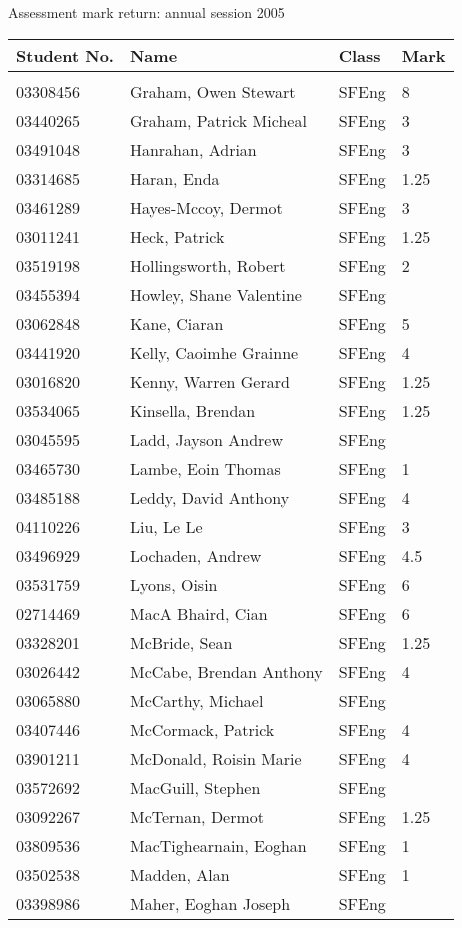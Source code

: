 \documentclass[a4paper]{article}
\begin{document}
\newpage
\begin{center}
Assessment mark return: annual session 2005
\end{center}

\begin{tabular}{llll}
Student No.&Name&Class&Mark\\[3pt]
 \hline\\[3pt]
03308456&Graham, Owen Stewart&SFEng&8\\
03440265&Graham, Patrick Micheal&SFEng&3\\
03491048&Hanrahan, Adrian&SFEng&3\\
03314685&Haran, Enda&SFEng&1.25\\
03461289&Hayes-Mccoy, Dermot&SFEng&3\\
03011241&Heck, Patrick&SFEng&1.25\\
03519198&Hollingsworth, Robert&SFEng&2\\
03455394&Howley, Shane Valentine&SFEng&\\
03062848&Kane, Ciaran&SFEng&5\\
03441920&Kelly, Caoimhe Grainne&SFEng&4\\
03016820&Kenny, Warren Gerard&SFEng&1.25\\
03534065&Kinsella, Brendan&SFEng&1.25\\
03045595&Ladd, Jayson Andrew&SFEng&\\
03465730&Lambe, Eoin Thomas&SFEng&1\\
03485188&Leddy, David Anthony&SFEng&4\\
04110226&Liu, Le Le&SFEng&3\\
03496929&Lochaden, Andrew&SFEng&4.5\\
03531759&Lyons, Oisin&SFEng&6\\
02714469&MacA Bhaird, Cian&SFEng&6\\
03328201&McBride, Sean&SFEng&1.25\\
03026442&McCabe, Brendan Anthony&SFEng&4\\
03065880&McCarthy, Michael&SFEng&\\
03407446&McCormack, Patrick&SFEng&4\\
03901211&McDonald, Roisin Marie&SFEng&4\\
03572692&MacGuill, Stephen&SFEng&\\
03092267&McTernan, Dermot&SFEng&1.25\\
03809536&MacTighearnain, Eoghan&SFEng&1\\
03502538&Madden, Alan&SFEng&1\\
03398986&Maher, Eoghan Joseph&SFEng&\\

\end{tabular}
\end{document}
